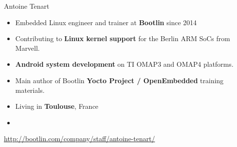 \begin{frame}{Antoine Tenart}
    \begin{itemize}
	\item Embedded Linux engineer and trainer at {\bf Bootlin}
              since 2014
  	\item Contributing to {\bf Linux kernel support} for the Berlin ARM
	      SoCs from Marvell.
	\item {\bf Android system development} on TI OMAP3 and OMAP4 platforms.
	\item Main author of Bootlin {\bf Yocto Project / OpenEmbedded}
	      training materials.
  	\item Living in {\bf Toulouse}, France
    	\item {}
    \end{itemize}
    {\small \url{http://bootlin.com/company/staff/antoine-tenart/}}
\end{frame}
